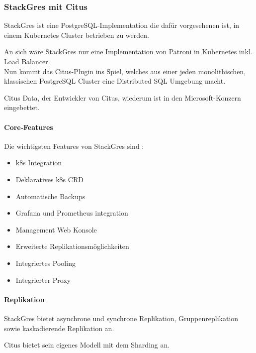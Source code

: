 \subsubsection{StackGres mit Citus}
\begin{flushleft} 
    StackGres ist eine \Gls{PostgreSQL}-Implementation die dafür vorgesehenen ist, in einem Kubernetes Cluster betrieben zu werden.
\end{flushleft} 
\begin{flushleft}
    An sich wäre StackGres nur eine Implementation von Patroni in Kubernetes inkl. Load Balancer.\\
    Nun kommt das Citus-Plugin ins Spiel, welches aus einer jeden monolithischen, klassischen \Gls{PostgreSQL Cluster} eine Distributed SQL Umgebung macht.
\end{flushleft}
\begin{flushleft}
    Citus Data, der Entwickler von Citus, wiederum ist in den Microsoft-Konzern eingebettet.
\end{flushleft}
\begin{flushleft}
    \paragraph{Core-Features}
    Die wichtigsten Features von StackGres sind \cite{G3XQA8PI}:
    \begin{itemize}
        \item k8s Integration
        \item Deklaratives k8s CRD
        \item Automatische Backups
        \item Grafana und Prometheus integration
        \item Management Web Konsole
        \item Erweiterte Replikationsmöglichkeiten
        \item Integriertes Pooling
        \item Integrierter Proxy
    \end{itemize}
\end{flushleft}
\begin{flushleft}
    \paragraph{Replikation}
    StackGres bietet asynchrone und synchrone Replikation, Gruppenreplikation sowie kaskadierende Replikation an.
\end{flushleft}
\begin{flushleft}
    Citus bietet sein eigenes Modell mit dem Sharding an.
\end{flushleft}
